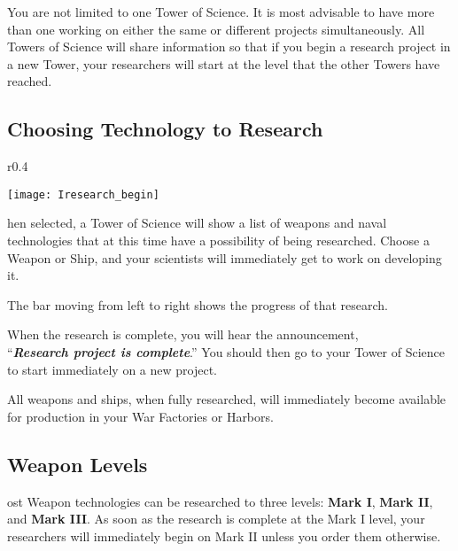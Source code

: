 
You are not limited to one Tower of Science. It is most advisable to have more than one working on either the same or different projects simultaneously. All Towers of Science will share information so that if you begin a research project in a new Tower, your researchers will start at the level that the other Towers have reached.

\subsection{\textsf{Choosing Technology to Research}}


\begin{wrapfigure}{r}{0.4\textwidth}
    \vspace{-20pt}
    \begin{center}
        \texttt{[image: Iresearch\_begin]} %
    \end{center}
    \vspace{-20pt}
\end{wrapfigure}

hen selected, a Tower of Science will show a list of weapons and naval technologies that at this time have a possibility of being researched. Choose a Weapon or Ship, and your scientists will immediately get to work on developing it.

The bar moving from left to right shows the progress of that research.

When the research is complete, you will hear the announcement, \\ %
“\textbf{\textit{Research project is complete}}.” You should then go to your Tower of Science to start immediately on a new project.

All weapons and ships, when fully researched, will immediately become available for production in your War Factories or Harbors.

\subsection{\textsf{Weapon Levels}}


ost Weapon technologies can be researched to three levels: \textbf{Mark I}, \textbf{Mark II}, and \textbf{Mark III}. As soon as the research is complete at the Mark I level, your researchers will immediately begin on Mark II unless you order them otherwise.

